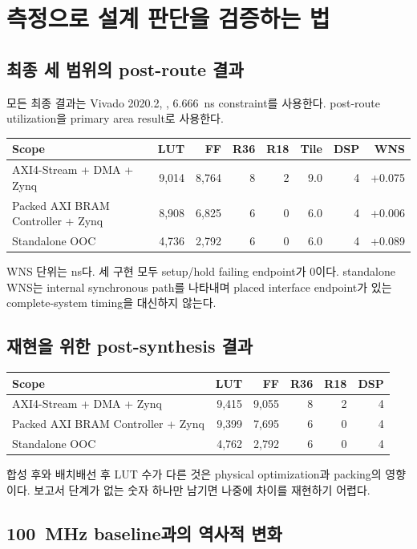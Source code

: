 \chapter{측정으로 설계 판단을 검증하는 법}

\section{최종 세 범위의 post-route 결과}

모든 최종 결과는 Vivado 2020.2, , 6.666~ns
constraint를 사용한다. post-route utilization을 primary area result로 사용한다.

\begin{longtable}{L{50mm}r r r r r r r}
\toprule
Scope & LUT & FF & R36 & R18 & Tile & DSP & WNS \\
\midrule
AXI4-Stream + DMA + Zynq & 9,014 & 8,764 & 8 & 2 & 9.0 & 4 & +0.075 \\
Packed AXI BRAM Controller + Zynq & 8,908 & 6,825 & 6 & 0 & 6.0 & 4 & +0.006 \\
Standalone  OOC & 4,736 & 2,792 & 6 & 0 & 6.0 & 4 & +0.089 \\
\bottomrule
\end{longtable}

WNS 단위는 ns다. 세 구현 모두 setup/hold failing endpoint가 0이다. standalone
WNS는 internal synchronous path를 나타내며 placed interface endpoint가 있는
complete-system timing을 대신하지 않는다.

\section{재현을 위한 post-synthesis 결과}

\begin{longtable}{L{58mm}r r r r r}
\toprule
Scope & LUT & FF & R36 & R18 & DSP \\
\midrule
AXI4-Stream + DMA + Zynq & 9,415 & 9,055 & 8 & 2 & 4 \\
Packed AXI BRAM Controller + Zynq & 9,399 & 7,695 & 6 & 0 & 4 \\
Standalone  OOC & 4,762 & 2,792 & 6 & 0 & 4 \\
\bottomrule
\end{longtable}

합성 후와 배치배선 후 LUT 수가 다른 것은 physical optimization과 packing의
영향이다. 보고서 단계가 없는 숫자 하나만 남기면 나중에 차이를 재현하기 어렵다.

\section{100~MHz baseline과의 역사적 변화}

